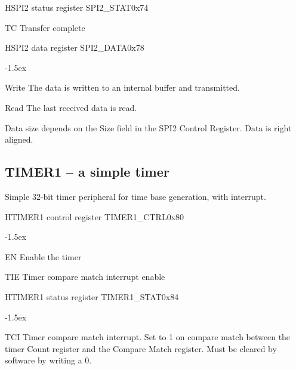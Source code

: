 \documentclass[12pt]{article}
\begin{document}
\begin{register}{H}{SPI2 status register SPI2\_STAT}{0x74}
\label{spi2stat}
%
%
%
\regnewline%
\end{register}
\begin{regdesc}[0.8\textwidth]\begin{reglist}[0000]
\item [TC] Transfer complete
\end{reglist}\end{regdesc}

\begin{register}{H}{SPI2 data register SPI2\_DATA}{0x78}
\label{spi2data}
%
\regnewline%
\end{register}
\begin{regdesc}[0.8\textwidth]\begin{reglist}[000000000]
\itemsep-1.5ex
\item[Write] The data is written to an internal buffer and transmitted.
\item[Read] The last received data is read.
\end{reglist}\end{regdesc}
Data size depends on the Size field in the SPI2 Control Register. Data is right aligned.


\subsection{TIMER1 -- a simple timer}
Simple 32-bit timer peripheral for time base generation, with interrupt.

\begin{register}{H}{TIMER1 control register TIMER1\_CTRL}{0x80}
\label{timer1ctrl}
%
%
%
%
\regnewline%
\end{register}
\begin{regdesc}[0.8\textwidth]\begin{reglist}[0000]
\itemsep-1.5ex
\item[EN] Enable the timer
\item[TIE] Timer compare match interrupt enable
\end{reglist}\end{regdesc}

\begin{register}{H}{TIMER1 status register TIMER1\_STAT}{0x84}
\label{timer1stat}
%
%
%
\regnewline%
\end{register}
\begin{regdesc}[0.8\textwidth]\begin{reglist}[0000]
\itemsep-1.5ex
\item[TCI] Timer compare match interrupt. Set to 1 on compare match between the timer Count register and the Compare Match register. Must be cleared by software by writing a 0.
\end{reglist}\end{regdesc}
\end{document}
